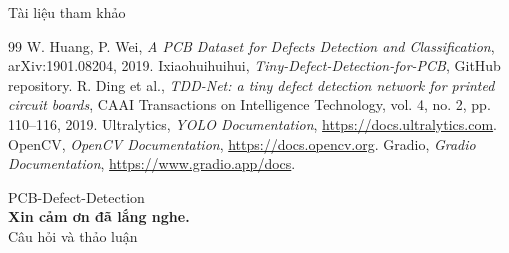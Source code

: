 \documentclass[aspectratio=169,11pt,t]{beamer}
\begin{document}
\begin{frame}{Tài liệu tham khảo}
  \footnotesize
  \begin{thebibliography}{99}
    \setlength{\itemsep}{3pt}
     W. Huang, P. Wei, \textit{A PCB Dataset for Defects Detection and Classification}, arXiv:1901.08204, 2019.
     Ixiaohuihuihui, \textit{Tiny-Defect-Detection-for-PCB}, GitHub repository.
     R. Ding et al., \textit{TDD-Net: a tiny defect detection network for printed circuit boards}, CAAI Transactions on Intelligence Technology, vol. 4, no. 2, pp. 110--116, 2019.
     Ultralytics, \textit{YOLO Documentation}, \url{https://docs.ultralytics.com}.
     OpenCV, \textit{OpenCV Documentation}, \url{https://docs.opencv.org}.
     Gradio, \textit{Gradio Documentation}, \url{https://www.gradio.app/docs}.
  \end{thebibliography}
\end{frame}

\begin{frame}[c]
  \vfill
  \hspace*{0.6cm}\begin{minipage}{13cm}
    {\color{coral}\ttfamily\fontsize{36}{40}\selectfont PCB-Defect-Detection}\\[10pt]
    {\fontsize{24}{28}\selectfont\bfseries Xin cảm ơn đã lắng nghe.}\\[10pt]
    {\color{muted}\large Câu hỏi và thảo luận}
  \end{minipage}
  \vfill
\end{frame}
\end{document}
